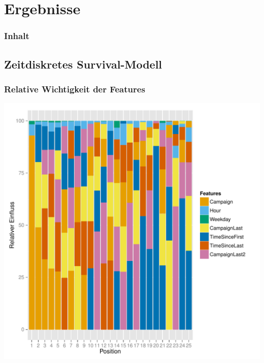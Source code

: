 \section{Ergebnisse}

\begin{frame}\frametitle{Inhalt}
\end{frame}

\subsection{Zeitdiskretes Survival-Modell}


\begin{frame}\frametitle{Relative Wichtigkeit der Features}
	\centering\includegraphics[scale=0.39]{variableImportance.pdf}
\end{frame}

